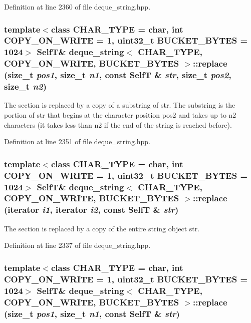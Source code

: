 Definition at line 2360 of file deque\_\-string.hpp.\hypertarget{classdeque__string_a80041a6c719e9ec64004af372ae17af}{
\subsubsection[{replace}]{\setlength{\rightskip}{0pt plus 5cm}template$<$class CHAR\_\-TYPE  = char, int COPY\_\-ON\_\-WRITE = 1, uint32\_\-t BUCKET\_\-BYTES = 1024$>$ {\bf SelfT}\& {\bf deque\_\-string}$<$ CHAR\_\-TYPE, COPY\_\-ON\_\-WRITE, BUCKET\_\-BYTES $>$::replace (size\_\-t {\em pos1}, \/  size\_\-t {\em n1}, \/  const {\bf SelfT} \& {\em str}, \/  size\_\-t {\em pos2}, \/  size\_\-t {\em n2})}}
\label{classdeque__string_a80041a6c719e9ec64004af372ae17af}


The section is replaced by a copy of a substring of str. The substring is the portion of str that begins at the character position pos2 and takes up to n2 characters (it takes less than n2 if the end of the string is reached before). 

Definition at line 2351 of file deque\_\-string.hpp.\hypertarget{classdeque__string_39ecf1ddad7e060513fdc9737ff3893a}{
\subsubsection[{replace}]{\setlength{\rightskip}{0pt plus 5cm}template$<$class CHAR\_\-TYPE  = char, int COPY\_\-ON\_\-WRITE = 1, uint32\_\-t BUCKET\_\-BYTES = 1024$>$ {\bf SelfT}\& {\bf deque\_\-string}$<$ CHAR\_\-TYPE, COPY\_\-ON\_\-WRITE, BUCKET\_\-BYTES $>$::replace (iterator {\em i1}, \/  iterator {\em i2}, \/  const {\bf SelfT} \& {\em str})}}
\label{classdeque__string_39ecf1ddad7e060513fdc9737ff3893a}


The section is replaced by a copy of the entire string object str. 

Definition at line 2337 of file deque\_\-string.hpp.\hypertarget{classdeque__string_d2e8ac524c0f6ad26297ef056f015688}{
\subsubsection[{replace}]{\setlength{\rightskip}{0pt plus 5cm}template$<$class CHAR\_\-TYPE  = char, int COPY\_\-ON\_\-WRITE = 1, uint32\_\-t BUCKET\_\-BYTES = 1024$>$ {\bf SelfT}\& {\bf deque\_\-string}$<$ CHAR\_\-TYPE, COPY\_\-ON\_\-WRITE, BUCKET\_\-BYTES $>$::replace (size\_\-t {\em pos1}, \/  size\_\-t {\em n1}, \/  const {\bf SelfT} \& {\em str})}}
\label{classdeque__string_d2e8ac524c0f6ad26297ef056f015688}


